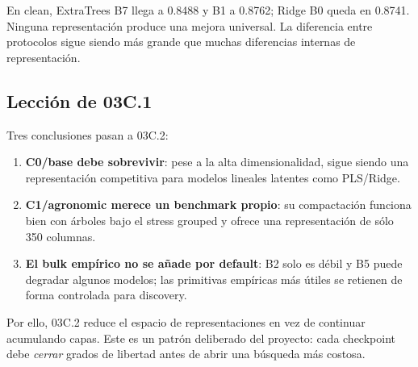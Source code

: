 En clean, ExtraTrees B7 llega a 0.8488 y B1 a 0.8762; Ridge B0 queda en 0.8741. Ninguna
representación produce una mejora universal. La diferencia entre protocolos sigue siendo más
grande que muchas diferencias internas de representación.

\subsection{Lección de 03C.1}

Tres conclusiones pasan a 03C.2:

\begin{enumerate}
\item \textbf{C0/base debe sobrevivir}: pese a la alta dimensionalidad, sigue siendo una
representación competitiva para modelos lineales latentes como PLS/Ridge.
\item \textbf{C1/agronomic merece un benchmark propio}: su compactación funciona bien con
árboles bajo el stress grouped y ofrece una representación de sólo 350 columnas.
\item \textbf{El bulk empírico no se añade por default}: B2 solo es débil y B5 puede
degradar algunos modelos; las primitivas empíricas más útiles se retienen de forma controlada
para discovery.
\end{enumerate}

Por ello, 03C.2 reduce el espacio de representaciones en vez de continuar acumulando capas.
Este es un patrón deliberado del proyecto: cada checkpoint debe \emph{cerrar} grados de
libertad antes de abrir una búsqueda más costosa.
